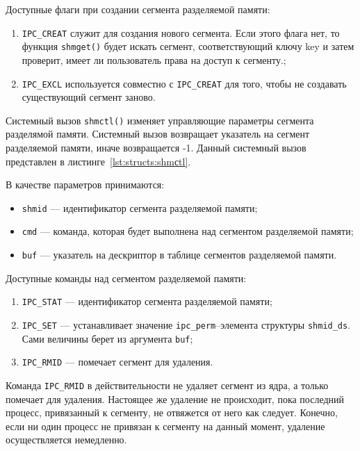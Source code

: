 Доступные флаги при создании сегмента разделяемой памяти:
\begin{enumerate}
	\item \texttt{IPC\_CREAT} служит для создания нового сегмента. Если этого флага нет, то функция \texttt{shmget()} будет искать сегмент, соответствующий ключу key и затем проверит, имеет ли пользователь права на доступ к сегменту.;
	\item \texttt{IPC\_EXCL} используется совместно с \texttt{IPC\_CREAT} для того, чтобы не создавать существующий сегмент заново.
\end{enumerate}

Системный вызов \texttt{shmctl()} изменяет управляющие параметры сегмента разделямой памяти. Системный вызов возвращает указатель на сегмент разделяемой памяти, иначе возвращается -1.
Данный системный вызов представлен в листинге~\ref{lst:structs:shmсtl}.



В качестве параметров принимаются:
\begin{itemize}
	\item \texttt{shmid} --- идентификатор сегмента разделяемой памяти;
	\item \texttt{cmd} --- команда, которая будет выполнена над сегментом разделяемой памяти;
	\item \texttt{buf} --- указатель на дескриптор в таблице сегментов разделяемой памяти.
\end{itemize}

Доступные команды над сегментом разделяемой памяти:
\begin{enumerate}
	\item \texttt{IPC\_STAT} --- идентификатор сегмента разделяемой памяти;
	\item \texttt{IPC\_SET} --- устанавливает значение \texttt{ipc\_perm}--элемента структуры \texttt{shmid\_ds}. Сами
	величины берет из аргумента \texttt{buf};
	\item \texttt{IPC\_RMID} --- помечает сегмент для удаления.
\end{enumerate}

Команда \texttt{IPC\_RMID} в действительности не удаляет сегмент из ядра, а только
помечает для удаления. Настоящее же удаление не происходит, пока последний процесс, привязанный к сегменту, не отвяжется от него как следует. Конечно, если ни один процесс не привязан к сегменту на данный момент, удаление осуществляется немедленно.

